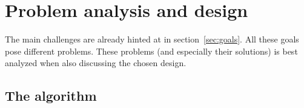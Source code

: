 
\section{Problem analysis and design} \label{sec:analysis-design} 

The main challenges are already hinted at in section~\ref{sec:goals}. All these
goals pose different problems. These problems (and especially their solutions)
is best analyzed when also discussing the chosen design. 

\subsection{The algorithm} 


